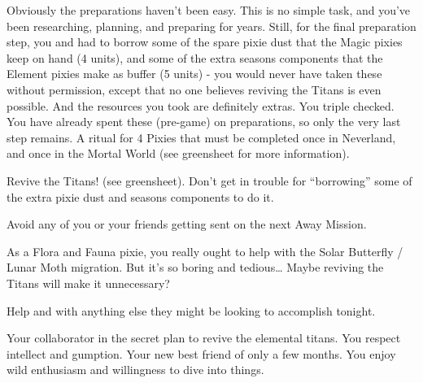 \documentclass[char]{PP}
\begin{document}
Obviously the preparations haven’t been easy. This is no simple task, and you’ve been researching, planning, and preparing for years. Still, for the final preparation step, you and \cETitan{} had to borrow some of the spare pixie dust that the Magic pixies keep on hand (4 units), and some of the extra seasons components that the Element pixies make as buffer (5 units) - you would never have taken these without permission, except that no one believes reviving the Titans is even possible. And the resources you took are definitely extras. You triple checked. You have already spent these (pre-game) on preparations, so only the very last step remains. A ritual for 4 Pixies that must be completed once in Neverland, and once in the Mortal World (see greensheet for more information).


\begin{itemz}
	\item Revive the Titans! (see greensheet). Don’t get in trouble for “borrowing” some of the extra pixie dust and seasons components to do it.
	\item Avoid any of you or your friends getting sent on the next Away Mission.
	\item As a Flora and Fauna pixie, you really ought to help with the Solar Butterfly / Lunar Moth migration. But it’s so boring and tedious… Maybe reviving the Titans will make it unnecessary?
	\item Help \cETitan{} and \cEAirship{} with anything else they might be looking to accomplish tonight.
\end{itemz}

\begin{itemz}[Notes]
	\item 
\end{itemz}

\begin{contacts}
	\contact{\cETitan{}} Your collaborator in the secret plan to revive the elemental titans. You respect \cETitan{\their} intellect and gumption.
	\contact{\cEAirship{}} Your new best friend of only a few months. You enjoy \cEAirship{\their} wild enthusiasm and willingness to dive into things.
\end{contacts}
\end{document}
